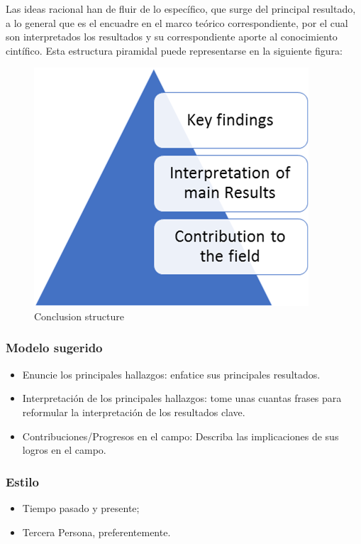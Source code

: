 \documentclass[a4paper,12pt]{article}
\begin{document}
Las ideas racional han de fluir  de lo específico, que surge del principal resultado, a  lo general que es el encuadre en el marco teórico correspondiente, por el cual son interpretados los resultados y su correspondiente aporte al conocimiento cintífico. Esta estructura piramidal puede representarse en la siguiente figura:

\begin{figure}[hbt!]
    \centering
\includegraphics[width=0.5\linewidth]{Figures/article_conclusion.png}
    \caption{Conclusion structure}

    \label{fig:conclusion}
\end{figure}


\subsubsection{Modelo sugerido}

\begin{itemize}
    \item Enuncie los principales hallazgos: enfatice sus principales resultados.
    \item Interpretación de los principales hallazgos: tome unas cuantas frases para reformular la interpretación de los resultados clave.
    \item Contribuciones/Progresos en el campo: Describa las implicaciones de sus logros en el campo.
\end{itemize}

\subsubsection{Estilo}
\begin{itemize} 
    \item Tiempo pasado y presente;
    \item  Tercera Persona, preferentemente.
    
\end{itemize} 
\end{document}

